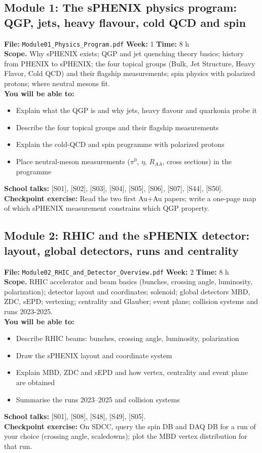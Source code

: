 \documentclass[11pt,letterpaper]{article}
\begin{document}
\subsection*{Module 1: The sPHENIX physics program: QGP, jets, heavy flavour, cold QCD and spin}
\textbf{File:} \texttt{Module01\_Physics\_Program.pdf} \quad \textbf{Week:} 1 \quad \textbf{Time:} 8 h\\
\textbf{Scope.} Why sPHENIX exists; QGP and jet quenching theory basics; history from PHENIX to sPHENIX; the four topical groups (Bulk, Jet Structure, Heavy Flavor, Cold QCD) and their flagship measurements; spin physics with polarized protons; where neutral mesons fit.\\
\textbf{You will be able to:}
\begin{itemize}
\item Explain what the QGP is and why jets, heavy flavour and quarkonia probe it
\item Describe the four topical groups and their flagship measurements
\item Explain the cold-QCD and spin programme with polarized protons
\item Place neutral-meson measurements ($\pi^0$, $\eta$, $R_{AA}$, cross sections) in the programme
\end{itemize}
\textbf{School talks:} [S01], [S02], [S03], [S04], [S05], [S06], [S07], [S44], [S50].\\
\textbf{Checkpoint exercise:} Read the two first Au+Au papers; write a one-page map of which sPHENIX measurement constrains which QGP property.
\medskip
\subsection*{Module 2: RHIC and the sPHENIX detector: layout, global detectors, runs and centrality}
\textbf{File:} \texttt{Module02\_RHIC\_and\_Detector\_Overview.pdf} \quad \textbf{Week:} 2 \quad \textbf{Time:} 8 h\\
\textbf{Scope.} RHIC accelerator and beam basics (bunches, crossing angle, luminosity, polarization); detector layout and coordinates; solenoid; global detectors MBD, ZDC, sEPD; vertexing; centrality and Glauber; event plane; collision systems and runs 2023-2025.\\
\textbf{You will be able to:}
\begin{itemize}
\item Describe RHIC beams: bunches, crossing angle, luminosity, polarization
\item Draw the sPHENIX layout and coordinate system
\item Explain MBD, ZDC and sEPD and how vertex, centrality and event plane are obtained
\item Summarise the runs 2023--2025 and collision systems
\end{itemize}
\textbf{School talks:} [S01], [S08], [S48], [S49], [S05].\\
\textbf{Checkpoint exercise:} On SDCC, query the spin DB and DAQ DB for a run of your choice (crossing angle, scaledowns); plot the MBD vertex distribution for that run.
\medskip
\end{document}
